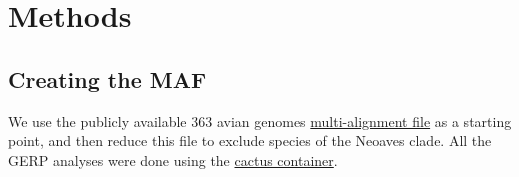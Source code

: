 \documentclass[
  letterpaper,
  DIV=11,
  numbers=noendperiod]{scrreprt}
\begin{document}
\section{Methods}\label{methods-1}

\subsection{Creating the MAF}\label{creating-the-maf}

We use the publicly available 363 avian genomes
\href{https://cgl.gi.ucsc.edu/data/cactus/363-avian-2020.hal}{multi-alignment
file} as a starting point, and then reduce this file to exclude species
of the Neoaves clade. All the GERP analyses were done using the
\href{https://quay.io/repository/comparative-genomics-toolkit/cactus}{cactus
container}.
\end{document}
